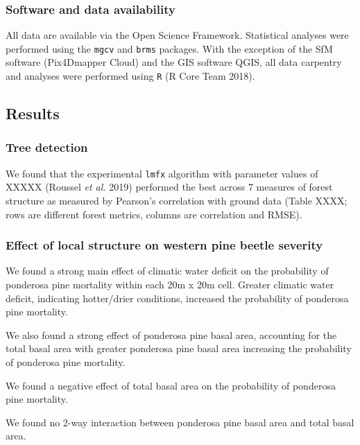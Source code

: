 \documentclass[]{article}
\begin{document}
\subsubsection{Software and data
availability}\label{software-and-data-availability}

All data are available via the Open Science Framework. Statistical
analyses were performed using the \texttt{mgcv} and \texttt{brms}
packages. With the exception of the SfM software (Pix4Dmapper Cloud) and
the GIS software QGIS, all data carpentry and analyses were performed
using \texttt{R} (R Core Team 2018).

\subsection{Results}\label{results}

\subsubsection{Tree detection}\label{tree-detection-1}

We found that the experimental \texttt{lmfx} algorithm with parameter
values of XXXXX (Roussel \emph{et al.} 2019) performed the best across 7
measures of forest structure as measured by Pearson's correlation with
ground data (Table XXXX; rows are different forest metrics, columns are
correlation and RMSE).

\subsubsection{Effect of local structure on western pine beetle
severity}\label{effect-of-local-structure-on-western-pine-beetle-severity}

We found a strong main effect of climatic water deficit on the
probability of ponderosa pine mortality within each 20m x 20m cell.
Greater climatic water deficit, indicating hotter/drier conditions,
increased the probability of ponderosa pine mortality.

We also found a strong effect of ponderosa pine basal area, accounting
for the total basal area with greater ponderosa pine basal area
increasing the probability of ponderosa pine mortality.

We found a negative effect of total basal area on the probability of
ponderosa pine mortality.

We found no 2-way interaction between ponderosa pine basal area and
total basal area.
\end{document}
